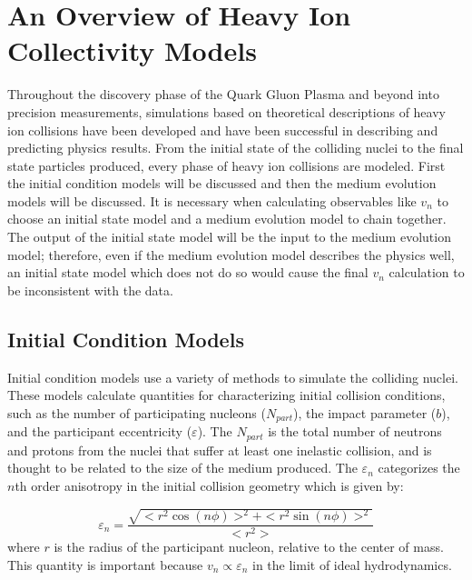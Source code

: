 \section{An Overview of Heavy Ion Collectivity Models}
Throughout the discovery phase of the Quark Gluon Plasma and beyond into precision measurements, simulations based on theoretical descriptions of heavy ion collisions have been developed and have been successful in describing and predicting physics results. From the initial state of the colliding nuclei to the final state particles produced, every phase of heavy ion collisions are modeled. First the initial condition models will be discussed and then the medium evolution models will be discussed. It is necessary when calculating observables like $v_n$ to choose an initial state model and a medium evolution model to chain together. The output of the initial state model will be the input to the medium evolution model; therefore, even if the medium evolution model describes the physics well, an initial state model which does not do so would cause the final $v_n$ calculation to be inconsistent with the data. 


\subsection{Initial Condition Models}
Initial condition models use a variety of methods to simulate the colliding nuclei. These models calculate quantities for characterizing initial collision conditions, such as the number of participating nucleons ($N_{part}$), the impact parameter ($b$), and the participant eccentricity ($\varepsilon$). The $N_{part}$ is the total number of neutrons and protons from the nuclei that suffer at least one inelastic collision, and is thought to be related to the size of the medium produced. The $\varepsilon_n$ categorizes the $n$th order anisotropy in the initial collision geometry which is given by:

\begin{equation}
\label{eqn:eccentricity_equation_ch2}
\varepsilon_n = \frac{\sqrt{<r^2 \cos(n\phi)>^2+<r^2 \sin(n\phi)>^2}}{<r^2>}
\end{equation}
where $r$ is the radius of the participant nucleon, relative to the center of mass. This quantity is important because $v_n \propto \varepsilon_n$ in the limit of ideal hydrodynamics.

